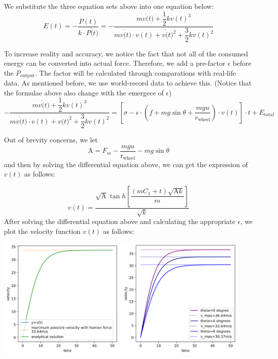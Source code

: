 \documentclass{article}
\begin{document}
\begin{itemize}
					We substitute the three equation sets above into one equation below:
					\[E (t)=-\dfrac{P (t)}{ k \cdot P \dot(t)}=-\dfrac{mv\ddot(t)+\dfrac{1}{2} k {v(t)}^3}{mv\dot(t)\cdot v(t)+v\dot(t)^2+\dfrac{3}{2} k {v(t)}^2}\]

					To increase reality and accuracy, we notice the fact that not all of the consumed energy can be converted into actual force. Therefore, we add a pre-factor \(\epsilon\) before the \(P_{\mathrm{output}}\). The factor will be calculated through comparations with real-life data. As mentioned before, we use world-record data to achieve this. (Notice that the formulae above also change with the emergece of \(\epsilon\))
					\[ -\dfrac{mv\ddot(t)+\dfrac{1}{2} k {v(t)}^3}{mv\dot(t)\cdot v(t)+v\dot(t)^2+\dfrac{3}{2} k {v(t)}^2} =  \left[\sigma-\epsilon\cdot\left(f+mg\sin \theta + \dfrac{mgu}{r_{\mathrm{wheel}}} \right)\cdot v(t)\right]\cdot t+ E _\mathrm{total}\]

					Out of brevity concerns, we let
					\[ \mathrm{A}=F_m-\dfrac{mgu}{\mathrm{r}_\mathrm{wheel}}-mg\sin \theta \]
					and then by solving the differential equation above, we can get the expression of \(v(t)\) as follows:

					\[v(t)=\dfrac{\sqrt{\mathrm{A}} \tan  h \left[\dfrac{\left(m C _1+t\right)\sqrt{\mathrm{A}k}}{m}\right]}{\sqrt{ k }}\]
					After solving the differential equation above and calculating the appropriate \(\epsilon\), we plot the velocity function \(v\left(t\right)\) as follows:

					\begin{center}
						\includegraphics[height=6cm]{1.png}
						\includegraphics[height=6cm]{2.png}


\end{center}
\end{itemize}
\end{document}
